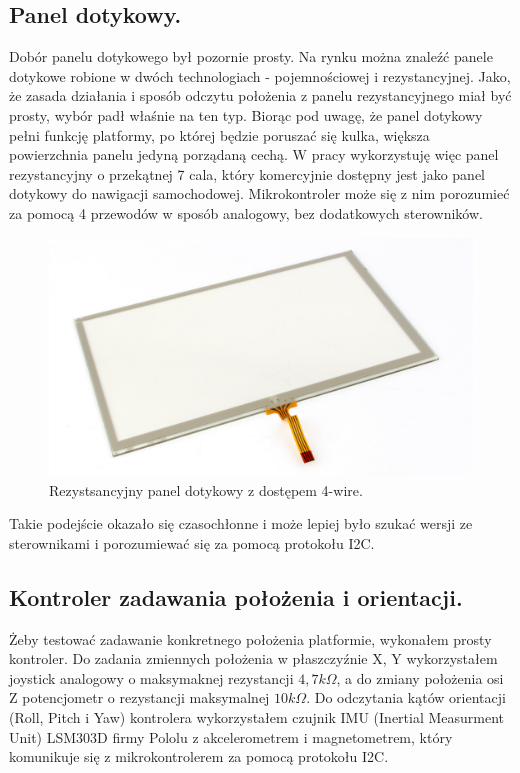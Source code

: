 \subsection{Panel dotykowy.}
Dobór panelu dotykowego był pozornie prosty. Na rynku można znaleźć panele dotykowe robione w dwóch technologiach - pojemnościowej i rezystancyjnej. 
Jako, że zasada działania i sposób odczytu położenia z panelu rezystancyjnego miał być prosty, wybór padł właśnie na ten typ.
Biorąc pod uwagę, że panel dotykowy pełni funkcję platformy, po której będzie poruszać się kulka, większa powierzchnia panelu jedyną porządaną cechą.
W pracy wykorzystuję więc panel rezystancyjny o przekątnej 7 cala, który komercyjnie dostępny jest jako panel dotykowy do nawigacji samochodowej.
Mikrokontroler może się z nim porozumieć za pomocą 4 przewodów w sposób analogowy, bez dodatkowych sterowników.

\begin{figure}[!h]
    \label{fig:anzelm}
    \centering
    \includegraphics[width=0.5\linewidth]{img/resistive_7_inch_touchscreen_b.jpg}
    \caption{Rezystsancyjny panel dotykowy z dostępem 4-wire.}
\end{figure}

Takie podejście okazało się czasochłonne i może lepiej było szukać wersji ze sterownikami i porozumiewać się za pomocą protokołu I2C.

\subsection{Kontroler zadawania położenia i orientacji.}
Żeby testować zadawanie konkretnego położenia platformie, wykonałem prosty kontroler. 
Do zadania zmiennych położenia w płaszczyźnie X, Y wykorzystałem joystick analogowy o maksymaknej rezystancji $4,7 k\Omega$, a do zmiany położenia osi Z potencjometr o rezystancji maksymalnej $10 k\Omega$.
Do odczytania kątów orientacji (Roll, Pitch i Yaw) kontrolera wykorzystałem czujnik IMU (Inertial Measurment Unit) LSM303D firmy Pololu z akcelerometrem i magnetometrem, który komunikuje się z mikrokontrolerem za pomocą protokołu I2C.

